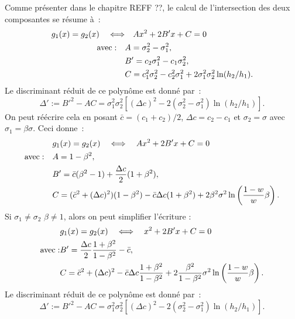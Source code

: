 \documentclass[main.tex]{subfiles}
\begin{document}
Comme présenter dans le chapitre REFF ??, le calcul de l'intersection des deux composantes se résume à~:
\begin{equation}
\begin{aligned}
\label{eq:anxe_polynome}
g_1(x)=g_2(x) \quad \Longleftrightarrow & \quad  Ax^2 + 2B'x + C =0 \\
{\rm avec :} \quad &A=\sigma_2^2 - \sigma_1^2, \\
& B'=c_2\sigma_1^2-c_1\sigma_2^2,\\
& C= c_1^2\sigma_2^2-c_2^2\sigma_1^2 +  2\sigma_1^2\sigma_2^2 \ln( h_2 / h_1 ).
\end{aligned}
\end{equation}
Le discriminant réduit de ce polynôme est donné par~:
\begin{equation}
\label{eq:anxe_discr_reduit}
\Delta' := B'^2 - AC = \sigma_1^2 \sigma_2^2 \left[ (\Delta c)^2 - 2(\sigma_2^2-\sigma_1^2) \ln (h_2/h_1)  \right].
\end{equation}
On peut réécrire cela en posant $\bar{c}=(c_1+c_2)/2$, $\Delta c = c_2-c_1$ et $\sigma_2=\sigma$ avec $\sigma_1=\beta \sigma$. Ceci donne~:
\begin{equation}
\begin{aligned}
\label{eq:anxe_polynome2}
&g_1(x)=g_2(x) \quad \Longleftrightarrow  \quad  Ax^2 + 2B'x + C =0 \\
{\rm avec :} \quad &A=1-\beta^2, \\
& B'=\bar{c}(\beta^2-1)+ \frac{\Delta c}{2}(1+\beta^2),\\
& C= (\bar{c}^2+(\Delta c)^2 ) (1-\beta^2) -\bar{c}\Delta c (1+\beta^2) + 2 \beta^2 \sigma^2 \ln \left( \frac{1-w}{w}\beta \right).
\end{aligned}
\end{equation}
Si $\sigma_1 \neq \sigma_2$ \ie $\beta \neq 1$, alors on peut simplifier  l'écriture :
\begin{equation}
\begin{aligned}
\label{eq:anxe_polynome3}
&g_1(x)=g_2(x) \quad \Longleftrightarrow  \quad  x^2 + 2B'x + C =0 \\
{\rm avec :} & B'=\frac{\Delta c}{2} \frac{1+\beta^2}{1-\beta^2}-\bar{c},\\
& C= \bar{c}^2+(\Delta c)^2 -\bar{c}\Delta c \frac{1+\beta^2}{1-\beta^2} + 2 \frac{\beta^2}{1-\beta^2} \sigma^2 \ln \left( \frac{1-w}{w}\beta \right).
\end{aligned}
\end{equation}
Le discriminant réduit de ce polynôme est donné par~:
\begin{equation}
\label{eq:anxe_discr_reduit}
\Delta' := B'^2 - AC = \sigma_1^2 \sigma_2^2 \left[ (\Delta c)^2 - 2(\sigma_2^2-\sigma_1^2) \ln (h_2/h_1)  \right].
\end{equation}
\end{document}

